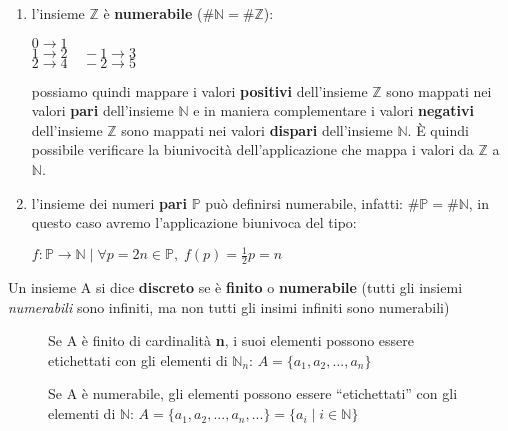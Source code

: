 \begin{enumerate}[nosep]
    \item l'insieme $\mathbb{Z}$ è \textbf{numerabile} ($\#\mathbb{N} = \#\mathbb{Z}$):
        \begin{center}
            $0 \rightarrow 1$ \\
            $1 \rightarrow 2 \;\;\;\; -1 \rightarrow 3$ \\
            $2 \rightarrow 4 \;\;\;\; -2 \rightarrow 5$
        \end{center}
    possiamo quindi mappare i valori \textbf{positivi} dell'insieme $\mathbb{Z}$ sono mappati nei valori \textbf{pari} dell'insieme $\mathbb{N}$ e in maniera complementare i valori \textbf{negativi} dell'insieme $\mathbb{Z}$ sono mappati nei valori \textbf{dispari} dell'insieme $\mathbb{N}$. È quindi possibile verificare la biunivocità dell'applicazione che mappa i valori da $\mathbb{Z}$ a $\mathbb{N}$.
    \item l'insieme dei numeri \textbf{pari} $\mathbb{P}$ può definirsi numerabile, infatti: $\#\mathbb{P} = \#\mathbb{N}$, in questo caso avremo l'applicazione biunivoca del tipo:
        \begin{center}
            $f : \mathbb{P} \rightarrow \mathbb{N} \; | \; \forall p = 2n \in \mathbb{P}, \; f(p) = \frac{1}{2}p = n$
        \end{center}
\end{enumerate}

\begin{boxA}
    Un insieme A si dice \textbf{discreto} se è \textbf{finito} o \textbf{numerabile} (tutti gli insiemi \textit{numerabili} sono infiniti, ma non tutti gli insimi infiniti sono numerabili)
\end{boxA}
\begin{figure}[h]
    \begin{minipage}[t]{0.4\textwidth}
        \centering
        Se A è finito di cardinalità \textbf{n}, i suoi elementi possono essere etichettati con gli elementi di $\mathbb{N}_n$: $A = \{a_1, a_2, ..., a_n\}$
    \end{minipage}
    \begin{minipage}[t]{0.5\textwidth}
        \centering
        Se A è numerabile, gli elementi possono essere ``etichettati'' con gli elementi di $\mathbb{N}$: $A = \{a_1, a_2, ..., a_n, ...\} = \{a_i \; | \; i \in \mathbb{N} \}$
    \end{minipage}
\end{figure}

